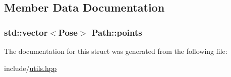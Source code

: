 \subsection{Member Data Documentation}
\subsubsection[{\texorpdfstring{points}{points}}]{\setlength{\rightskip}{0pt plus 5cm}std\+::vector$<${\bf Pose}$>$ Path\+::points}\hypertarget{structPath_a9847c298e904e1230b5706d22ed56c17}{}\label{structPath_a9847c298e904e1230b5706d22ed56c17}


The documentation for this struct was generated from the following file\+:\begin{DoxyCompactItemize}
\item 
include/\hyperlink{utils_8hpp}{utils.\+hpp}\end{DoxyCompactItemize}
